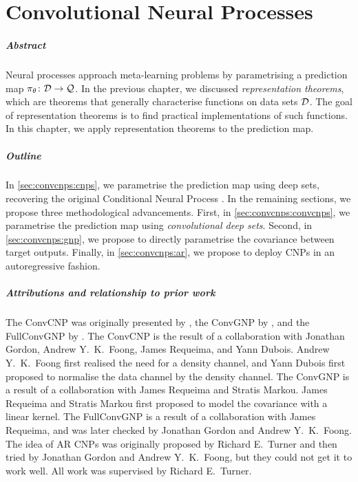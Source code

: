 \documentclass[12pt]{report}
\begin{document}
\chapter
    [Convolutional Neural Processes]
    {Convolutional Neural Processes}
\label{chap:convcnps}

\paragraph{Abstract}
Neural processes approach meta-learning problems by parametrising a prediction map $\pi_\theta \colon \mathcal{D} \to \mathcal{Q}$.
In the previous chapter, we discussed \emph{representation theorems}, which are theorems that generally characterise functions on data sets $\mathcal{D}$.
The goal of representation theorems is to find practical implementations of such functions.
In this chapter, we apply representation theorems to the prediction map.

\paragraph{Outline}
In \cref{sec:convcnps:cnps},
we parametrise the prediction map using deep sets, recovering the original Conditional Neural Process \parencite[CNP;][]{Garnelo:2018:Conditional_Neural_Processes}.
In the remaining sections, we propose three methodological advancements.
First, in \cref{sec:convcnps:convcnps}, we parametrise the prediction map using \emph{convolutional deep sets}.
Second, in \cref{sec:convcnps:gnp}, we propose to directly parametrise the covariance between target outputs.
Finally, in \cref{sec:convcnps:ar}, we propose to deploy CNPs in an autoregressive fashion.

\paragraph{Attributions and relationship to prior work}
The ConvCNP was originally presented by ,
the ConvGNP by ,
and the FullConvGNP by .
The ConvCNP is the result of a collaboration with
Jonathan Gordon, Andrew Y.\ K.\ Foong, James Requeima, and Yann Dubois.
Andrew Y.\ K.\ Foong first realised the need for a density channel,
and Yann Dubois first proposed to normalise the data channel by the density channel.
The ConvGNP is a result of a collaboration with
James Requeima and Stratis Markou.
James Requeima and Stratis Markou first proposed to model the covariance with a linear kernel.
The FullConvGNP is a result of a collaboration with
James Requeima,
and was later checked by Jonathan Gordon and Andrew Y.\ K.\ Foong.
The idea of AR CNPs was originally proposed by Richard E.\ Turner
and then tried by Jonathan Gordon and Andrew Y.\ K.\ Foong,
but they could not get it to work well.
All work was supervised by Richard E.\ Turner.
\end{document}
